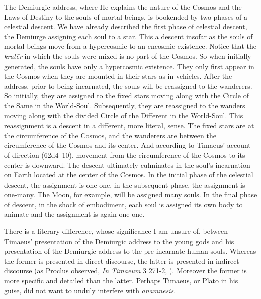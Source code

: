 The Demiurgic address, where He explains the nature of the Cosmos and the Laws of Destiny to the souls of mortal beings, is bookended by two phases of a celestial descent. We have already described the first phase of celestial descent, the Demiurge assigning each soul to a star. This a descent insofar as the souls of mortal beings move from a hypercosmic to an encosmic existence. Notice that the \emph{kratēr} in which the souls were mixed is no part of the Cosmos. So when initially generated, the souls have only a hypercosmic existence. They only first appear in the Cosmos when they are mounted in their stars as in vehicles. After the address, prior to being incarnated, the souls will be reassigned to the wanderers. So initially, they are assigned to the fixed stars moving along with the Circle of the Same in the World-Soul. Subsequently, they are reassigned to the wanders moving along with the divided Circle of the Different in the World-Soul. This reassignment is a descent in a different, more literal, sense. The fixed stars are at the circumference of the Cosmos, and the wanderers are between the circumference of the Cosmos and its center. And according to Timaeus' account of direction (62d4–10), movement from the circumference of the Cosmos to its center is downward. The descent ultimately culminates in the soul's incarnation on Earth located at the center of the Cosmos. In the initial phase of the celestial descent, the assignment is one-one, in the subsequent phase, the assignment is one-many. The Moon, for example, will be assigned many souls. In the final phase of descent, in the shock of embodiment, each soul is assigned its own body to animate and the assignment is again one-one.

There is a literary difference, whose significance I am unsure of, between Timaeus' presentation of the Demiurgic address to the young gods and his presentation of the Demiurgic address to the pre-incarnate human souls. Whereas the former is presented in direct discourse, the latter is presented in indirect discourse (as Proclus observed, \emph{In Timaeum} 3 271-2, \citealt{Diehl:1903re}). Moreover the former is more specific and detailed than the latter. Perhaps Timaeus, or Plato in his guise, did not want to unduly interfere with \emph{anamnesis}.

